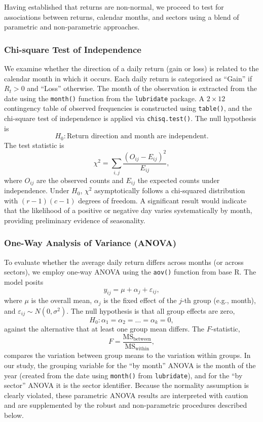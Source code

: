 \documentclass[12pt,a4paper,fleqn]{article}
\begin{document}
Having established that returns are non-normal, we proceed to test for associations between returns, calendar months, and sectors using a blend of parametric and non-parametric approaches.

\subsubsection{Chi-square Test of Independence}

We examine whether the direction of a daily return (gain or loss) is related to the calendar month in which it occurs. Each daily return is categorised as ``Gain'' if \(R_t>0\) and ``Loss'' otherwise. The month of the observation is extracted from the date using the \texttt{month()} function from the \texttt{lubridate} package. A \(2\times12\) contingency table of observed frequencies is constructed using \texttt{table()}, and the chi-square test of independence \cite{pearson1900chi} is applied via \texttt{chisq.test()}. The null hypothesis is
\[
H_0: \text{Return direction and month are independent.}
\]
The test statistic is
\begin{equation}
\chi^2 = \sum_{i,j} \frac{(O_{ij} - E_{ij})^2}{E_{ij}},
\label{eq:chisq}
\end{equation}
where \(O_{ij}\) are the observed counts and \(E_{ij}\) the expected counts under independence. Under \(H_0\), \(\chi^2\) asymptotically follows a chi-squared distribution with \((r-1)(c-1)\) degrees of freedom. A significant result would indicate that the likelihood of a positive or negative day varies systematically by month, providing preliminary evidence of seasonality.

\subsubsection{One-Way Analysis of Variance (ANOVA)}

To evaluate whether the average daily return differs across months (or across sectors), we employ one-way ANOVA \cite{fisher1925statistical} using the \texttt{aov()} function from base R. The model posits
\[
y_{ij} = \mu + \alpha_j + \varepsilon_{ij},
\]
where \(\mu\) is the overall mean, \(\alpha_j\) is the fixed effect of the \(j\)-th group (e.g., month), and \(\varepsilon_{ij}\sim N(0,\sigma^2)\). The null hypothesis is that all group effects are zero,
\[
H_0: \alpha_1 = \alpha_2 = \dots = \alpha_k = 0,
\]
against the alternative that at least one group mean differs. The \(F\)-statistic,
\begin{equation}
F = \frac{\text{MS}_{\text{between}}}{\text{MS}_{\text{within}}},
\label{eq:F}
\end{equation}
compares the variation between group means to the variation within groups. In our study, the grouping variable for the ``by month'' ANOVA is the month of the year (created from the date using \texttt{month()} from \texttt{lubridate}), and for the ``by sector'' ANOVA it is the sector identifier. Because the normality assumption is clearly violated, these parametric ANOVA results are interpreted with caution and are supplemented by the robust and non-parametric procedures described below.
\end{document}
